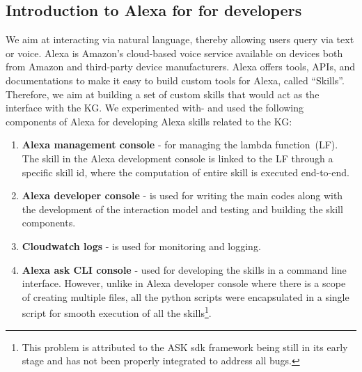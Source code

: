 \documentclass[10pt,journal,compsoc]{IEEEtran}
\begin{document}
\subsection{Introduction to Alexa for for developers} 
\noindent We aim at interacting via natural language, thereby allowing users query via text or voice. Alexa is Amazon’s cloud-based voice service available on devices both from Amazon and third-party device manufacturers. Alexa offers tools, APIs, and documentations to make it easy to build custom tools for Alexa, called ``Skills''. Therefore, we aim at building a set of custom skills that would act as the interface with the KG. %
We experimented with- and used the following components of Alexa for developing Alexa skills related to the KG: %

\begin{enumerate}
    \item \textbf{Alexa management console} - for managing the lambda function~(LF). The skill in the Alexa development console is linked to the LF through a specific skill id, where the computation of entire skill is executed end-to-end. %
    \item \textbf{Alexa developer console} - is used for writing the main codes along with the development of the interaction model and testing and building the skill components.
    \item \textbf{Cloudwatch logs} - is used for monitoring and logging.
    \item  \textbf{Alexa ask CLI console}  - used for developing the skills in a command line interface. However, unlike in Alexa developer console where there is a scope of creating multiple files, all the python scripts were encapsulated in a single script for smooth execution of all the skills\footnote{This problem is attributed to the ASK sdk framework being still in its early stage and has not been properly integrated to address all bugs.}.
\end{enumerate}
\end{document}
